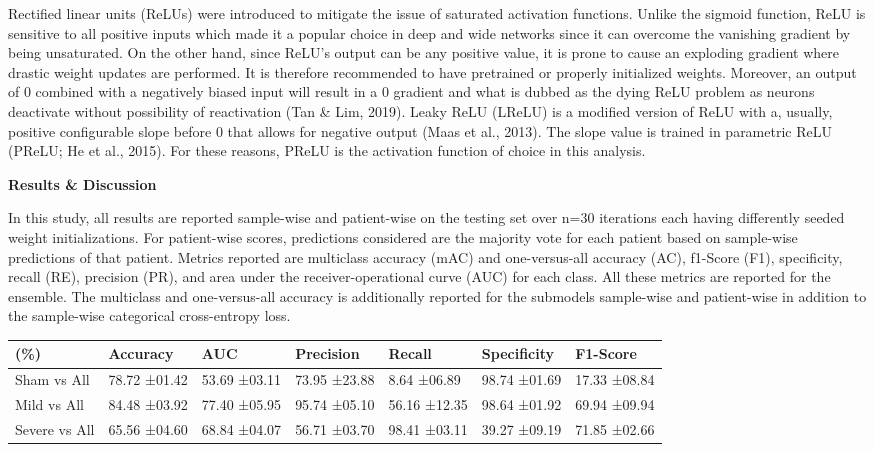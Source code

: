 \documentclass[
]{article}
\begin{document}
Rectified linear units (ReLUs) were introduced to mitigate the issue of
saturated activation functions. Unlike the sigmoid function, ReLU is
sensitive to all positive inputs which made it a popular choice in deep
and wide networks since it can overcome the vanishing gradient by being
unsaturated. On the other hand, since ReLU's output can be any positive
value, it is prone to cause an exploding gradient where drastic weight
updates are performed. It is therefore recommended to have pretrained or
properly initialized weights. Moreover, an output of 0 combined with a
negatively biased input will result in a 0 gradient and what is dubbed
as the dying ReLU problem as neurons deactivate without possibility of
reactivation (Tan \& Lim, 2019). Leaky ReLU (LReLU) is a modified
version of ReLU with a, usually, positive configurable slope before 0
that allows for negative output (Maas et al., 2013). The slope value is
trained in parametric ReLU (PReLU; He et al., 2015). For these reasons,
PReLU is the activation function of choice in this analysis.

\textbf{Results \& Discussion}

In this study, all results are reported sample-wise and patient-wise on
the testing set over n=30 iterations each having differently seeded
weight initializations. For patient-wise scores, predictions considered
are the majority vote for each patient based on sample-wise predictions
of that patient. Metrics reported are multiclass accuracy (mAC) and
one-versus-all accuracy (AC), f1-Score (F1), specificity, recall (RE),
precision (PR), and area under the receiver-operational curve (AUC) for
each class. All these metrics are reported for the ensemble. The
multiclass and one-versus-all accuracy is additionally reported for the
submodels sample-wise and patient-wise in addition to the sample-wise
categorical cross-entropy loss.

\begin{longtable}[]{@{}lllllll@{}}
\toprule
(\%) & \textbf{Accuracy} & \textbf{AUC} & \textbf{Precision} &
\textbf{Recall} & \textbf{Specificity} &
\textbf{F1-Score}\tabularnewline
\midrule
\endhead
Sham vs All & 78.72 ±01.42 & 53.69 ±03.11 & 73.95 ±23.88 & 8.64 ±06.89 &
98.74 ±01.69 & 17.33 ±08.84\tabularnewline
Mild vs All & 84.48 ±03.92 & 77.40 ±05.95 & 95.74 ±05.10 & 56.16 ±12.35
& 98.64 ±01.92 & 69.94 ±09.94\tabularnewline
Severe vs All & 65.56 ±04.60 & 68.84 ±04.07 & 56.71 ±03.70 & 98.41
±03.11 & 39.27 ±09.19 & 71.85 ±02.66\tabularnewline
\bottomrule
\end{longtable}
\end{document}

